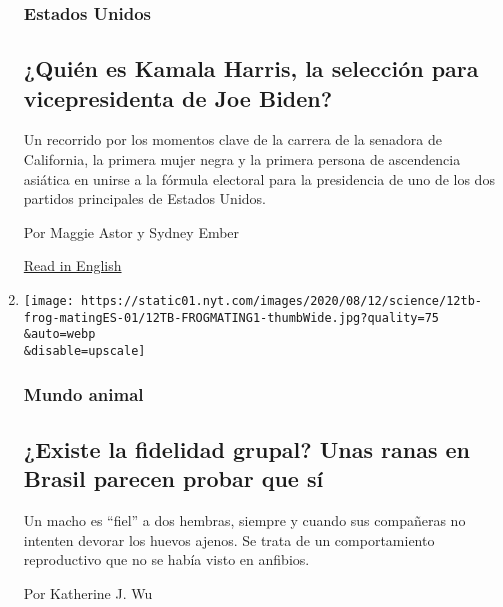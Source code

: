 \begin{enumerate}
  \hypertarget{estados-unidos-1}{%
  \subsubsection{Estados Unidos}\label{estados-unidos-1}}

  \hypertarget{quiuxe9n-es-kamala-harris-la-selecciuxf3n-para-vicepresidenta-de-joe-biden-1}{%
  \subsection{¿Quién es Kamala Harris, la selección para vicepresidenta
  de Joe
  Biden?}\label{quiuxe9n-es-kamala-harris-la-selecciuxf3n-para-vicepresidenta-de-joe-biden-1}}

  Un recorrido por los momentos clave de la carrera de la senadora de
  California, la primera mujer negra y la primera persona de ascendencia
  asiática en unirse a la fórmula electoral para la presidencia de uno
  de los dos partidos principales de Estados Unidos.

  Por Maggie Astor y Sydney Ember

  \href{https://www.nytimes.com/2020/08/11/us/politics/kamala-bio.html}{Read
  in English}
\item
  \href{/es/2020/08/12/espanol/ciencia-y-tecnologia/ranas-brasil.html}{}

  \texttt{[image: https://static01.nyt.com/images/2020/08/12/science/12tb-frog-matingES-01/12TB-FROGMATING1-thumbWide.jpg?quality=75\\\&auto=webp\\\&disable=upscale]}

  \hypertarget{mundo-animal-1}{%
  \subsubsection{Mundo animal}\label{mundo-animal-1}}

  \hypertarget{existe-la-fidelidad-grupal-unas-ranas-en-brasil-parecen-probar-que-suxed}{%
  \subsection{¿Existe la fidelidad grupal? Unas ranas en Brasil parecen
  probar que
  sí}\label{existe-la-fidelidad-grupal-unas-ranas-en-brasil-parecen-probar-que-suxed}}

  Un macho es ``fiel'' a dos hembras, siempre y cuando sus compañeras no
  intenten devorar los huevos ajenos. Se trata de un comportamiento
  reproductivo que no se había visto en anfibios.

  Por Katherine J. Wu


\end{enumerate}
